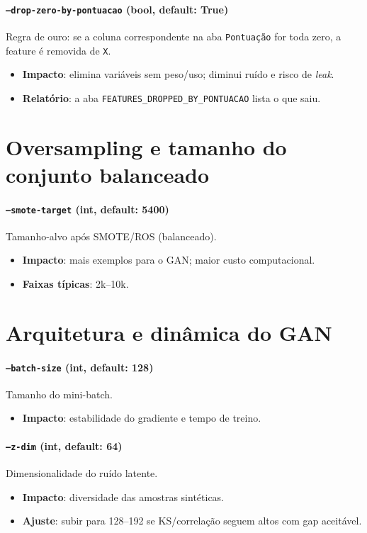 \documentclass[11pt,a4paper]{article}
\begin{document}
\paragraph{\texttt{--drop-zero-by-pontuacao} (bool, default: True)} Regra de ouro: se a coluna correspondente na aba \texttt{Pontuação} for toda zero, a feature é removida de \texttt{X}.
\begin{itemize}[leftmargin=1.2em]
  \item \textbf{Impacto}: elimina variáveis sem peso/uso; diminui ruído e risco de \emph{leak}.
  \item \textbf{Relatório}: a aba \texttt{FEATURES\_DROPPED\_BY\_PONTUACAO} lista o que saiu.
\end{itemize}

\section{Oversampling e tamanho do conjunto balanceado}

\paragraph{\texttt{--smote-target} (int, default: 5400)} Tamanho-alvo após SMOTE/ROS (balanceado).
\begin{itemize}[leftmargin=1.2em]
  \item \textbf{Impacto}: mais exemplos para o GAN; maior custo computacional.
  \item \textbf{Faixas típicas}: 2k--10k.
\end{itemize}

\section{Arquitetura e dinâmica do GAN}

\paragraph{\texttt{--batch-size} (int, default: 128)} Tamanho do mini-batch.
\begin{itemize}[leftmargin=1.2em]
  \item \textbf{Impacto}: estabilidade do gradiente e tempo de treino.
\end{itemize}

\paragraph{\texttt{--z-dim} (int, default: 64)} Dimensionalidade do ruído latente.
\begin{itemize}[leftmargin=1.2em]
  \item \textbf{Impacto}: diversidade das amostras sintéticas.
  \item \textbf{Ajuste}: subir para 128--192 se KS/correlação seguem altos com gap aceitável.
\end{itemize}
\end{document}
